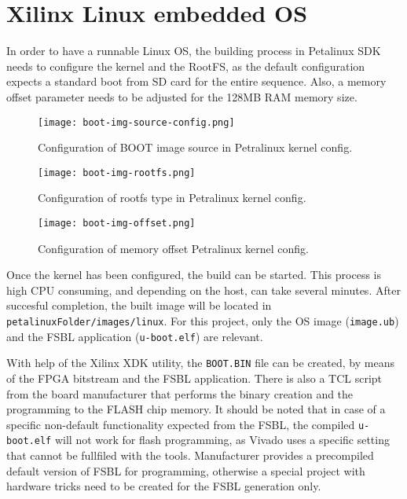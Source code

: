 \section{Xilinx Linux embedded OS}

In order to have a runnable Linux OS, the building process in Petalinux SDK needs to configure the
kernel and the RootFS, as the default configuration expects a standard boot from SD card for the
entire sequence. Also, a memory offset parameter needs to be adjusted for the 128MB RAM memory size.

\begin{figure}[htp]
	\centering
	\texttt{[image: boot-img-source-config.png]}
	\caption{Configuration of BOOT image source in Petralinux kernel config.}
	\label{fig:boot-img-source-config}
\end{figure}

\begin{figure}[htp]
	\centering
	\texttt{[image: boot-img-rootfs.png]}
	\caption{Configuration of rootfs type in Petralinux kernel config.}
	\label{fig:boot-img-rootfs}
\end{figure}

\begin{figure}[htp]
	\centering
	\texttt{[image: boot-img-offset.png]}
	\caption{Configuration of memory offset Petralinux kernel config.}
	\label{fig:boot-img-source-offset}
\end{figure}

Once the kernel has been configured, the build can be started. This process is high CPU consuming,
and depending on the host, can take several minutes. After succesful completion, the built image
will be located in \texttt{petalinuxFolder/images/linux}. For this project, only the OS image
(\texttt{image.ub}) and the FSBL application (\texttt{u-boot.elf}) are relevant.

With help of the Xilinx XDK utility, the \texttt{BOOT.BIN} file can be created, by means of the
FPGA bitstream and the FSBL application. There is also a TCL script from the board manufacturer that
performs the binary creation and the programming to the FLASH chip memory. It should be noted that
in case of a specific non-default functionality expected from the FSBL, the compiled
\texttt{u-boot.elf} will not work for flash programming, as Vivado uses a specific setting that
cannot be fullfiled with the tools. Manufacturer provides a precompiled default version of FSBL for
programming, otherwise a special project with hardware tricks need to be created for the FSBL
generation only.

